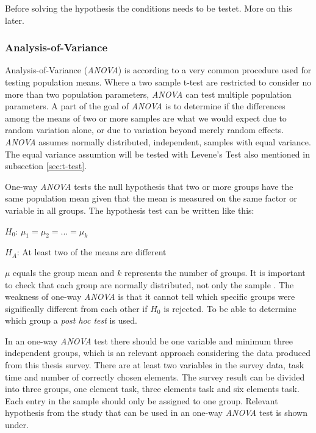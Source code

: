 Before solving the hypothesis the conditions needs to be testet. More on this later. %

\subsubsection[ANOVA]{Analysis-of-Variance}\label{sec:anova}
Analysis-of-Variance (\textit{ANOVA}) is according to \cite{Walpole2012} a very common procedure used for testing population means. Where a two sample t-test are restricted to consider no more than two population parameters, \textit{ANOVA} can test multiple population parameters. A part of the goal of \textit{ANOVA} is to determine if the differences among the means of two or more samples are what we would expect due to random variation alone, or due to variation beyond merely random effects. \textit{ANOVA} assumes normally distributed, independent, samples with equal variance. The equal variance assumtion will be tested with Levene's Test also mentioned in subsection \ref{sec:t-test}. 

One-way \textit{ANOVA} tests the null hypothesis that two or more groups have the same population mean given that the mean is measured on the same factor or variable in all groups\citep{LundResearchLtd2013a}. The hypothesis test can be written like this:\newline

\centerline{$H_{0}$:  $\mu_{1} =  \mu_{2} = ... = \mu_{k} $} 
\centerline{$H_{A}$:  At least two of the means are different}

$\mu$ equals the group mean and $k$ represents the number of groups. It is important to check that each group are normally distributed, not only the sample \citep{LundResearchLtd2013a}. The weakness of one-way \textit{ANOVA} is that it cannot tell which specific groups were significally different from each other if $H_{0}$ is rejected. To be able to determine which group a \textit{post hoc test} is used. 

In an one-way \textit{ANOVA} test there should be one variable and minimum three independent groups, which is an relevant approach considering the data produced from this thesis survey. There are at least two variables in the survey data, task time and number of correctly chosen elements. The survey result can be divided into three groups, one element task, three elements task and six elements task. Each entry in the sample should only be assigned to one group. Relevant hypothesis from the study that can be used in an one-way \textit{ANOVA} test is shown under. \newline

